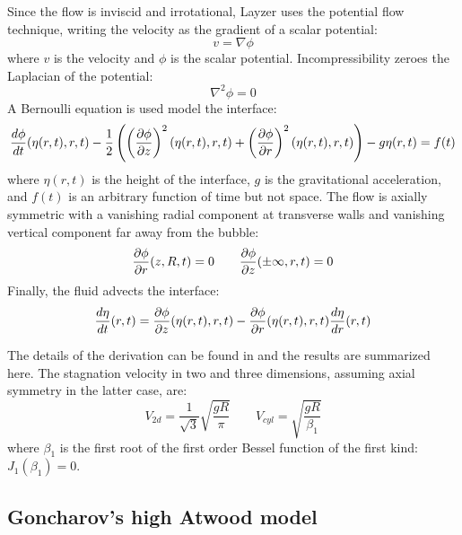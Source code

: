 Since the flow is inviscid and irrotational, Layzer uses the potential flow technique, writing the velocity as the gradient of a scalar potential:
\begin{equation}
v = \nabla \phi
\end{equation}
where 
$v$ is the velocity and 
$\phi$ is the scalar potential.
Incompressibility zeroes the Laplacian of the potential:
\begin{equation}
\nabla^2 \phi = 0
\end{equation}
A Bernoulli equation is used model the interface:
\begin{equation} \label{eqn:LayzerBernoulli}
\frac{d \phi}{d t}(\eta(r,t), r, t) - \frac{1}{2} \left(\left(\frac{\partial \phi}{\partial z}\right)^2(\eta(r,t), r, t) +\left(\frac{\partial \phi}{\partial r}\right)^2(\eta(r,t), r, t)\right) - g \eta(r,t) = f(t)
\end{equation}
where 
$\eta(r,t)$ is the height of the interface,
$g$ is the gravitational acceleration, and 
$f(t)$ is an arbitrary function of time but not space.
The flow is axially symmetric with a vanishing radial component at transverse walls and vanishing vertical component far away from the bubble:
\begin{equation}
\frac{\partial \phi}{\partial r}(z,R,t) = 0 \qquad \frac{\partial \phi}{\partial z}(\pm \infty, r, t) = 0
\end{equation}
Finally, the fluid advects the interface:
\begin{equation}
\frac{d \eta}{d t}(r,t) = \frac{\partial \phi}{\partial z}(\eta(r,t), r, t) - \frac{\partial \phi}{\partial r}(\eta(r,t), r, t) \frac{d \eta}{d r}(r,t)
\end{equation}

The details of the derivation can be found in  and the results are summarized here.
The stagnation velocity in two and three dimensions, assuming axial symmetry in the latter case, are:
\begin{equation}
V_{2d} = \frac{1}{\sqrt{3}} \sqrt{\frac{g R}{\pi}}  \qquad V_{cyl} = \sqrt{\frac{g R}{\beta_1}} 
\end{equation}
where $\beta_1$ is the first root of the first order Bessel function of the first kind: $J_{1}(\beta_1) = 0$.

\subsection{Goncharov's high Atwood model}

